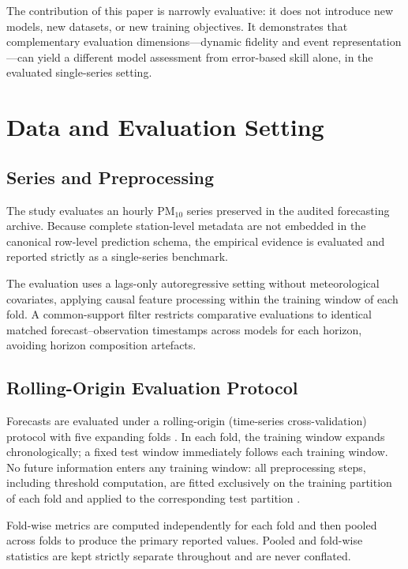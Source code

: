\documentclass[12pt]{article}
\begin{document}
The contribution of this paper is narrowly evaluative: it does not
introduce new models, new datasets, or new training objectives. It
demonstrates that complementary evaluation dimensions---dynamic fidelity
and event representation---can yield a different model assessment from
error-based skill alone, in the evaluated single-series setting.

\section{Data and Evaluation Setting}
\label{sec:methods}

\subsection{Series and Preprocessing}
\label{sec:data}

The study evaluates an hourly PM$_{10}$ series preserved in the audited
forecasting archive. Because complete station-level metadata are not
embedded in the canonical row-level prediction schema, the empirical
evidence is evaluated and reported strictly as a single-series benchmark.

The evaluation uses a lags-only autoregressive setting without
meteorological covariates, applying causal feature processing within
the training window of each fold. A common-support filter restricts
comparative evaluations to identical matched forecast--observation
timestamps across models for each horizon, avoiding horizon composition
artefacts.

\subsection{Rolling-Origin Evaluation Protocol}
\label{sec:rolling_origin}

Forecasts are evaluated under a rolling-origin (time-series
cross-validation) protocol with five expanding folds
\citep{tashman2000,bergmeir2018}. In each fold, the training window
expands chronologically; a fixed test window immediately follows each
training window. No future information enters any training window:
all preprocessing steps, including threshold computation, are fitted
exclusively on the training partition of each fold and applied to
the corresponding test partition \citep{kaufman2012}.

Fold-wise metrics are computed independently for each fold and then
pooled across folds to produce the primary reported values. Pooled and
fold-wise statistics are kept strictly separate throughout and are
never conflated.
\end{document}
